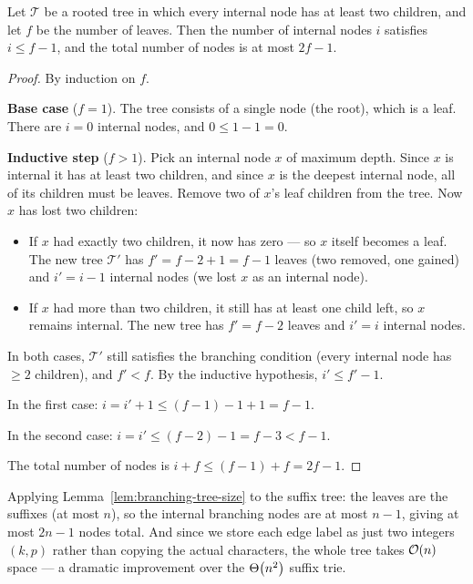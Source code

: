 \begin{formaldetails}
\begin{lemma}
  \label{lem:branching-tree-size}
  Let $\mathcal{T}$ be a rooted tree in which every internal node has at
  least two children, and let $f$ be the number of leaves.
  Then the number of internal nodes $i$ satisfies $i \le f - 1$, and the
  total number of nodes is at most $2f - 1$.
\end{lemma}
\begin{proof}
  By induction on $f$.

  \textbf{Base case} ($f = 1$).
  The tree consists of a single node (the root), which is a leaf.
  There are $i = 0$ internal nodes, and $0 \le 1 - 1 = 0$. \checkmark

  \textbf{Inductive step} ($f > 1$).
  Pick an internal node $x$ of maximum depth.
  Since $x$ is internal it has at least two children, and since $x$ is
  the deepest internal node, all of its children must be leaves.
  Remove two of $x$'s leaf children from the tree.
  Now $x$ has lost two children:
  \begin{itemize}[nosep]
    \item If $x$ had exactly two children, it now has zero --- so $x$
          itself becomes a leaf.
          The new tree $\mathcal{T}'$ has $f' = f - 2 + 1 = f - 1$ leaves
          (two removed, one gained) and $i' = i - 1$ internal nodes
          (we lost $x$ as an internal node).
    \item If $x$ had more than two children, it still has at least one
          child left, so $x$ remains internal.
          The new tree has $f' = f - 2$ leaves and $i' = i$ internal nodes.
  \end{itemize}
  In both cases, $\mathcal{T}'$ still satisfies the branching condition
  (every internal node has $\ge 2$ children), and $f' < f$.
  By the inductive hypothesis, $i' \le f' - 1$.

  In the first case: $i = i' + 1 \le (f - 1) - 1 + 1 = f - 1$. \checkmark

  In the second case: $i = i' \le (f - 2) - 1 = f - 3 < f - 1$. \checkmark

  The total number of nodes is $i + f \le (f - 1) + f = 2f - 1$.
\end{proof}
\end{formaldetails}

Applying Lemma~\ref{lem:branching-tree-size} to the suffix tree: the
leaves are the suffixes (at most $n$), so the internal branching nodes
are at most $n - 1$, giving at most $2n - 1$ nodes total.
And since we store each edge label as just two integers $(k, p)$ rather
than copying the actual characters, the whole tree takes $\mathcal{O}\!\left(n\right)$ space
--- a dramatic improvement over the $\Theta\!\left(n^2\right)$ suffix trie.

